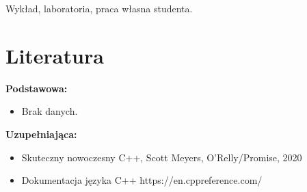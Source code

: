 \documentclass[12pt, a4paper]{article}
\begin{document}
Wykład, laboratoria, praca własna studenta.

\section{Literatura}

\textbf{Podstawowa:}
\begin{itemize}
  \item Brak danych.
\end{itemize}

\textbf{Uzupełniająca:}
\begin{itemize}
  \item Skuteczny nowoczesny C++, Scott Meyers, O'Relly/Promise, 2020
  \item Dokumentacja języka C++ https://en.cppreference.com/
\end{itemize}
\end{document}
